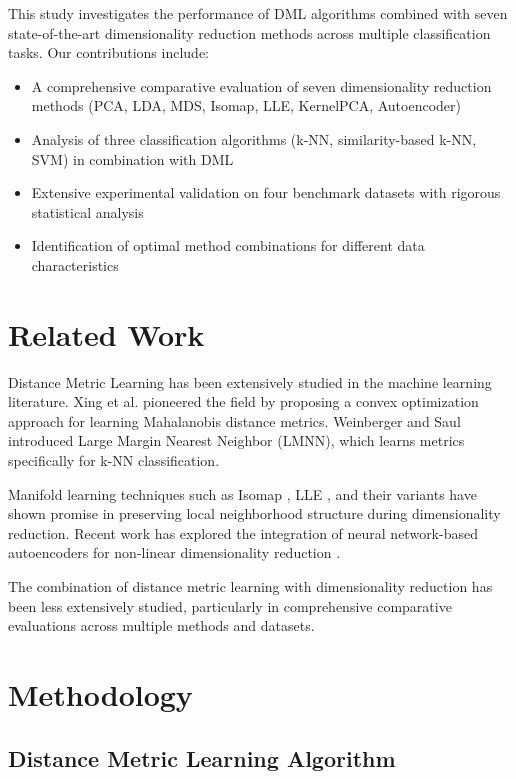 \documentclass[12pt,a4paper]{article}
\begin{document}
This study investigates the performance of DML algorithms combined with seven state-of-the-art dimensionality reduction methods across multiple classification tasks. Our contributions include:

\begin{itemize}
    \item A comprehensive comparative evaluation of seven dimensionality reduction methods (PCA, LDA, MDS, Isomap, LLE, KernelPCA, Autoencoder)
    \item Analysis of three classification algorithms (k-NN, similarity-based k-NN, SVM) in combination with DML
    \item Extensive experimental validation on four benchmark datasets with rigorous statistical analysis
    \item Identification of optimal method combinations for different data characteristics
\end{itemize}

\section{Related Work}

Distance Metric Learning has been extensively studied in the machine learning literature. Xing et al. \cite{xing2002distance} pioneered the field by proposing a convex optimization approach for learning Mahalanobis distance metrics. Weinberger and Saul \cite{weinberger2009distance} introduced Large Margin Nearest Neighbor (LMNN), which learns metrics specifically for k-NN classification.

Manifold learning techniques such as Isomap \cite{tenenbaum2000global}, LLE \cite{roweis2000nonlinear}, and their variants have shown promise in preserving local neighborhood structure during dimensionality reduction. Recent work has explored the integration of neural network-based autoencoders for non-linear dimensionality reduction \cite{hinton2006reducing}.

The combination of distance metric learning with dimensionality reduction has been less extensively studied, particularly in comprehensive comparative evaluations across multiple methods and datasets.

\section{Methodology}

\subsection{Distance Metric Learning Algorithm}
\end{document}
